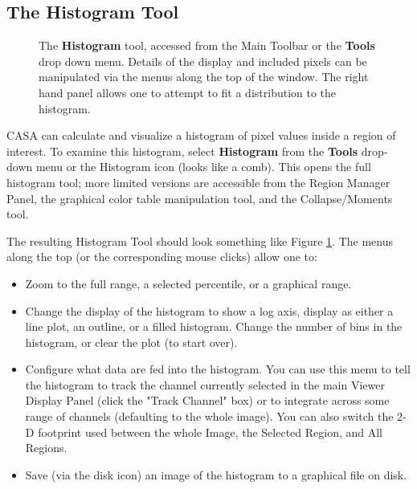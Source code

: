 
\subsection{The Histogram Tool}
\label{section:display.image.histogram}

\begin{figure}[h!]
\begin{center}
\caption{\label{fig:viewer_histogram} The {\bf Histogram} tool, accessed from
the Main Toolbar or the {\bf Tools} drop down menu. Details of the display and
included pixels can be manipulated
via the menus along the top of the window. The right hand panel allows one to
attempt to fit a distribution to the histogram.}
\hrulefill
\end{center}
\end{figure}

CASA can calculate and visualize a histogram of pixel values inside a region of interest. To examine this histogram, select 
{\bf Histogram} from the {\bf Tools} drop-down menu or the Histogram icon (looks like a comb). This opens the full histogram
tool; more limited versions are accessible from the Region Manager Panel, the graphical color table manipulation tool,
and the Collapse/Moments tool. 

The resulting Histogram Tool should look something like Figure \ref{fig:viewer_histogram}. The menus along the top
(or the corresponding mouse clicks) allow one to:

\begin{itemize}
\item Zoom to the full range, a selected percentile, or a graphical range.
\item Change the display of the histogram to show a log axis, display as either a line plot, an outline, or a filled histogram. Change
the number of bins in the histogram, or clear the plot (to start over).
\item Configure what data are fed into the histogram. You can use this menu to tell the histogram to track the channel currently
selected in the main Viewer Display Panel (click the "Track Channel" box) or to integrate across some range of channels (defaulting
to the whole image). You can also switch the 2-D footprint used between the whole Image, the Selected Region, and All Regions.
\item Save (via the disk icon) an image of the histogram to a graphical file on disk.
\end{itemize}

